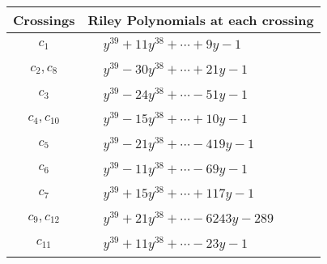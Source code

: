 \documentclass[1p]{elsarticle_modified}
\theoremstyle{definition}
\begin{document}
\begin{tabular}{m{50pt}|m{274pt}}
Crossings & \hspace{64pt}Riley Polynomials at each crossing \\
\hline $$\begin{aligned}c_{1}\end{aligned}$$&$\begin{aligned}
&y^{39}+11 y^{38}+\cdots+9 y-1
\end{aligned}$\\
\hline $$\begin{aligned}c_{2},c_{8}\end{aligned}$$&$\begin{aligned}
&y^{39}-30 y^{38}+\cdots+21 y-1
\end{aligned}$\\
\hline $$\begin{aligned}c_{3}\end{aligned}$$&$\begin{aligned}
&y^{39}-24 y^{38}+\cdots-51 y-1
\end{aligned}$\\
\hline $$\begin{aligned}c_{4},c_{10}\end{aligned}$$&$\begin{aligned}
&y^{39}-15 y^{38}+\cdots+10 y-1
\end{aligned}$\\
\hline $$\begin{aligned}c_{5}\end{aligned}$$&$\begin{aligned}
&y^{39}-21 y^{38}+\cdots-419 y-1
\end{aligned}$\\
\hline $$\begin{aligned}c_{6}\end{aligned}$$&$\begin{aligned}
&y^{39}-11 y^{38}+\cdots-69 y-1
\end{aligned}$\\
\hline $$\begin{aligned}c_{7}\end{aligned}$$&$\begin{aligned}
&y^{39}+15 y^{38}+\cdots+117 y-1
\end{aligned}$\\
\hline $$\begin{aligned}c_{9},c_{12}\end{aligned}$$&$\begin{aligned}
&y^{39}+21 y^{38}+\cdots-6243 y-289
\end{aligned}$\\
\hline $$\begin{aligned}c_{11}\end{aligned}$$&$\begin{aligned}
&y^{39}+11 y^{38}+\cdots-23 y-1
\end{aligned}$\\
\hline
\end{tabular}\\~\\
\end{document}
